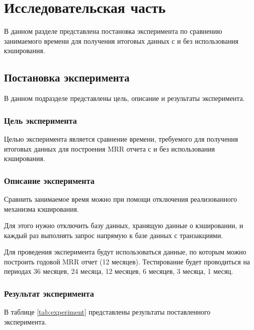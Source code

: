 \chapter{Исследовательская часть}

В данном разделе представлена постановка эксперимента по сравнению занимаемого времени для получения итоговых данных с и без использования кэширования.

\section{Постановка эксперимента}

В данном подразделе представлены цель, описание и результаты эксперимента.

\subsection{Цель эксперимента}

Целью эксперимента является сравнение времени, требуемого для получения итоговых данных для построения MRR отчета с и без использования кэширования.

\subsection{Описание эксперимента}

Сравнить занимаемое время можно при помощи отключения реализованного механизма кэширования.

Для этого нужно отключить базу данных, хранящую данные о кэшировании, и каждый раз выполнять запрос напрямую к базе данных с транзакциями.

Для проведения эксперимента будут использоваться данные, по которым можно построить годовой MRR отчет (12 месяцев). Тестирование будет проводиться на периодах 36 месяцев, 24 месяца, 12 месяцев, 6 месяцев, 3 месяца, 1 месяц.

\subsection{Результат эксперимента}

В таблице \ref{tab:experiment} представлены результаты поставленного эксперимента.

